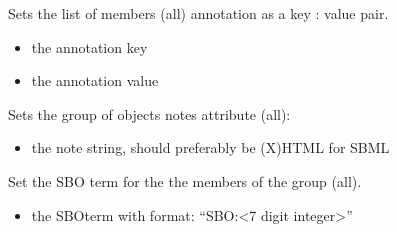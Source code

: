 \documentclass[letterpaper,10pt,english]{sphinxmanual}
\begin{document}
\begin{fulllineitems}
\begin{fulllineitems}
\begin{itemize}
\end{itemize}

\end{fulllineitems}


\begin{fulllineitems}
\label{\detokenize{modules_doc:cbmpy.CBModel.Group.setSharedAnnotation}}
\pysigstartsignatures
{}
\pysigstopsignatures
\sphinxAtStartPar
Sets the list of members (all) annotation as a key : value pair.
\begin{itemize}
\item {} 
\sphinxAtStartPar
{} the annotation key

\item {} 
\sphinxAtStartPar
{} the annotation value

\end{itemize}

\end{fulllineitems}


\begin{fulllineitems}
\label{\detokenize{modules_doc:cbmpy.CBModel.Group.setSharedNotes}}
\pysigstartsignatures
{}
\pysigstopsignatures
\sphinxAtStartPar
Sets the group of objects notes attribute (all):
\begin{itemize}
\item {} 
\sphinxAtStartPar
{} the note string, should preferably be (X)HTML for SBML

\end{itemize}

\end{fulllineitems}


\begin{fulllineitems}
\label{\detokenize{modules_doc:cbmpy.CBModel.Group.setSharedSBOterm}}
\pysigstartsignatures
{}
\pysigstopsignatures
\sphinxAtStartPar
Set the SBO term for the the members of the group (all).
\begin{itemize}
\item {} 
\sphinxAtStartPar
{} the SBOterm with format: “SBO:\textless{}7 digit integer\textgreater{}”


\end{itemize}
\end{fulllineitems}
\end{fulllineitems}
\end{document}
